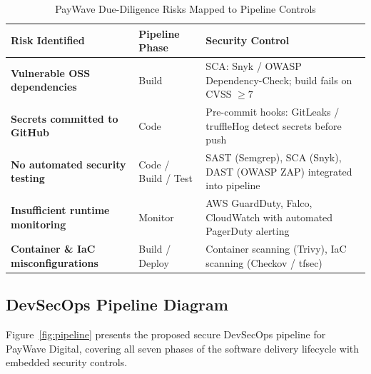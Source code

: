 \documentclass[12pt,a4paper]{article}
\begin{document}
\begin{table}[H]
\centering
\caption{PayWave Due-Diligence Risks Mapped to Pipeline Controls}
\label{tab:risk-control}
\renewcommand{\arraystretch}{1.4}
\begin{tabularx}{\textwidth}{>{\bfseries}p{4.2cm} p{3cm} X}
\toprule
\textbf{Risk Identified} & \textbf{Pipeline Phase} & \textbf{Security Control} \\
\midrule
\rowcolor{lightgray}
Vulnerable OSS dependencies & Build &
  SCA: Snyk / OWASP Dependency-Check; build fails on CVSS $\geq 7$ \\
Secrets committed to GitHub & Code &
  Pre-commit hooks: GitLeaks / truffleHog detect secrets before push \\
\rowcolor{lightgray}
No automated security testing & Code / Build / Test &
  SAST (Semgrep), SCA (Snyk), DAST (OWASP ZAP) integrated into pipeline \\
Insufficient runtime monitoring & Monitor &
  AWS GuardDuty, Falco, CloudWatch with automated PagerDuty alerting \\
\rowcolor{lightgray}
Container \& IaC misconfigurations & Build / Deploy &
  Container scanning (Trivy), IaC scanning (Checkov / tfsec) \\
\bottomrule
\end{tabularx}
\renewcommand{\arraystretch}{1}
\end{table}

\subsection{DevSecOps Pipeline Diagram}

Figure~\ref{fig:pipeline} presents the proposed secure DevSecOps pipeline for PayWave
Digital, covering all seven phases of the software delivery lifecycle with embedded
security controls.
\end{document}
